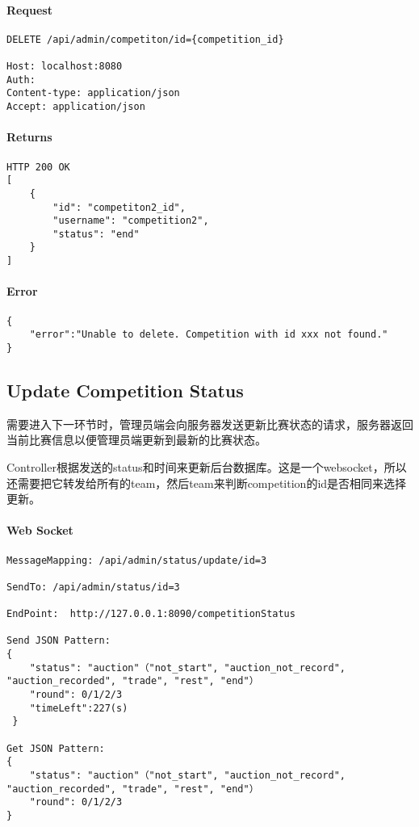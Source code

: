 \documentclass{article}
\begin{document}
\paragraph*{Request}
\begin{lstlisting}
DELETE /api/admin/competiton/id={competition_id}

Host: localhost:8080
Auth:
Content-type: application/json
Accept: application/json
\end{lstlisting}

\paragraph*{Returns}
\begin{lstlisting}
HTTP 200 OK
[
    {
        "id": "competiton2_id",
        "username": "competition2",
        "status": "end"
    }
]
\end{lstlisting}

\paragraph*{Error}
\begin{lstlisting}
{
    "error":"Unable to delete. Competition with id xxx not found."
}
\end{lstlisting}

\subsection{Update Competition Status}

需要进入下一环节时，管理员端会向服务器发送更新比赛状态的请求，服务器返回当前比赛信息以便管理员端更新到最新的比赛状态。

Controller根据发送的status和时间来更新后台数据库。这是一个websocket，所以还需要把它转发给所有的team，然后team来判断competition的id是否相同来选择更新。

\paragraph*{Web Socket}
\begin{lstlisting}
MessageMapping: /api/admin/status/update/id=3

SendTo: /api/admin/status/id=3

EndPoint:  http://127.0.0.1:8090/competitionStatus

Send JSON Pattern:
{
    "status": "auction"（"not_start", "auction_not_record", "auction_recorded", "trade", "rest", "end"）
    "round": 0/1/2/3
    "timeLeft":227(s)
 }

Get JSON Pattern:
{
    "status": "auction"（"not_start", "auction_not_record", "auction_recorded", "trade", "rest", "end"）
    "round": 0/1/2/3
}
\end{lstlisting}
\end{document}
